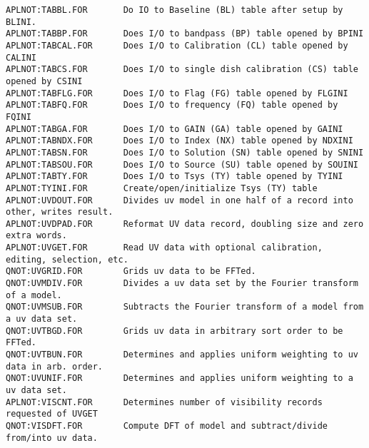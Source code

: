 \begin{verbatim}
APLNOT:TABBL.FOR       Do IO to Baseline (BL) table after setup by BLINI.
APLNOT:TABBP.FOR       Does I/O to bandpass (BP) table opened by BPINI
APLNOT:TABCAL.FOR      Does I/O to Calibration (CL) table opened by CALINI
APLNOT:TABCS.FOR       Does I/O to single dish calibration (CS) table opened by CSINI
APLNOT:TABFLG.FOR      Does I/O to Flag (FG) table opened by FLGINI
APLNOT:TABFQ.FOR       Does I/O to frequency (FQ) table opened by FQINI
APLNOT:TABGA.FOR       Does I/O to GAIN (GA) table opened by GAINI
APLNOT:TABNDX.FOR      Does I/O to Index (NX) table opened by NDXINI
APLNOT:TABSN.FOR       Does I/O to Solution (SN) table opened by SNINI
APLNOT:TABSOU.FOR      Does I/O to Source (SU) table opened by SOUINI
APLNOT:TABTY.FOR       Does I/O to Tsys (TY) table opened by TYINI
APLNOT:TYINI.FOR       Create/open/initialize Tsys (TY) table
APLNOT:UVDOUT.FOR      Divides uv model in one half of a record into other, writes result.
APLNOT:UVDPAD.FOR      Reformat UV data record, doubling size and zero extra words.
APLNOT:UVGET.FOR       Read UV data with optional calibration, editing, selection, etc.
QNOT:UVGRID.FOR        Grids uv data to be FFTed.
QNOT:UVMDIV.FOR        Divides a uv data set by the Fourier transform of a model.
QNOT:UVMSUB.FOR        Subtracts the Fourier transform of a model from a uv data set.
QNOT:UVTBGD.FOR        Grids uv data in arbitrary sort order to be FFTed.
QNOT:UVTBUN.FOR        Determines and applies uniform weighting to uv data in arb. order.
QNOT:UVUNIF.FOR        Determines and applies uniform weighting to a uv data set.
APLNOT:VISCNT.FOR      Determines number of visibility records requested of UVGET
QNOT:VISDFT.FOR        Compute DFT of model and subtract/divide from/into uv data.
\end{verbatim}
 
